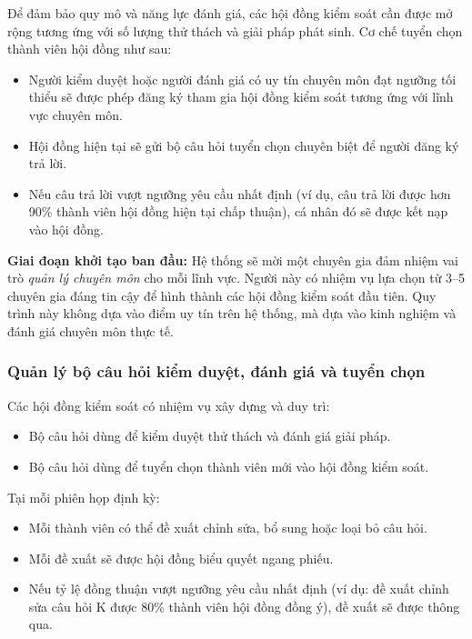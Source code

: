 Để đảm bảo quy mô và năng lực đánh giá, các hội đồng kiểm soát cần được mở rộng tương ứng với số lượng thử thách và giải pháp phát sinh. Cơ chế tuyển chọn thành viên hội đồng như sau:

\begin{itemize}
  \item Người kiểm duyệt hoặc người đánh giá có uy tín chuyên môn đạt ngưỡng tối thiểu sẽ được phép đăng ký tham gia hội đồng kiểm soát tương ứng với lĩnh vực chuyên môn.
  \item Hội đồng hiện tại sẽ gửi bộ câu hỏi tuyển chọn chuyên biệt để người đăng ký trả lời.
  \item Nếu câu trả lời vượt ngưỡng yêu cầu nhất định (ví dụ, câu trả lời được hơn 90\% thành viên hội đồng hiện tại chấp thuận), cá nhân đó sẽ được kết nạp vào hội đồng.
\end{itemize}

\textbf{Giai đoạn khởi tạo ban đầu:} Hệ thống sẽ mời một chuyên gia đảm nhiệm vai trò \textit{quản lý chuyên môn} cho mỗi lĩnh vực. Người này có nhiệm vụ lựa chọn từ 3--5 chuyên gia đáng tin cậy để hình thành các hội đồng kiểm soát đầu tiên.
Quy trình này không dựa vào điểm uy tín trên hệ thống, mà dựa vào kinh nghiệm và đánh giá chuyên môn thực tế.

\subsubsection{Quản lý bộ câu hỏi kiểm duyệt, đánh giá và tuyển chọn}

Các hội đồng kiểm soát có nhiệm vụ xây dựng và duy trì:
\begin{itemize}
  \item Bộ câu hỏi dùng để kiểm duyệt thử thách và đánh giá giải pháp.
  \item Bộ câu hỏi dùng để tuyển chọn thành viên mới vào hội đồng kiểm soát.
\end{itemize}

Tại mỗi phiên họp định kỳ:
\begin{itemize}
  \item Mỗi thành viên có thể đề xuất chỉnh sửa, bổ sung hoặc loại bỏ câu hỏi.
  \item Mỗi đề xuất sẽ được hội đồng biểu quyết ngang phiếu.
  \item Nếu tỷ lệ đồng thuận vượt ngưỡng yêu cầu nhất định (ví dụ: đề xuất chỉnh sửa câu hỏi K được 80\% thành viên hội đồng đồng ý), đề xuất sẽ được thông qua.
\end{itemize}

